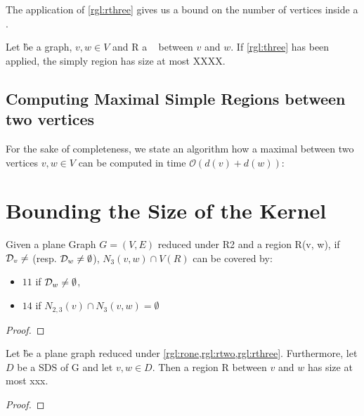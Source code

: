 The application of \cref{rgl:rthree} gives us a bound on the number of vertices inside a \sr. 
\begin{corollary}
    Let \G be a graph, $v, w\in V$ and R a \sr~ between $v$ and $w$. If \cref{rgl:three} has been applied, the simply region has size at most XXXX.
\end{corollary}

\subsection{Computing Maximal Simple Regions between two vertices}

For the sake of completeness, we state an algorithm how a maximal \sr between two vertices $v,w \in V$ can be computed in time $\mathcal{O}(d(v) + d(w))$:

%    


%    

\section{Bounding the Size of the Kernel}


\begin{lemma}
   Given a plane Graph $G = (V,E)$ reduced under R2 and a region R(v, w), if $\mathcal{D}_{v} \neq $ (resp. $\mathcal{D}_{w} \neq \emptyset$), $N_3(v,w) \cap V(R)$ can be covered by: 
   \begin{itemize}
    \item $11$ \sr if $\mathcal{D}_{w} \neq \emptyset$, 
    \item $14$ \sr if $N_{2,3}(v) \cap N_3(v,w) = \emptyset$
   \end{itemize}
\end{lemma}

\begin{proof} 
\end{proof}

\begin{lemma}
    Let \G be a plane graph reduced under \cref{rgl:rone,rgl:rtwo,rgl:rthree}. Furthermore, let $D$ be a SDS of G and let $v,w \in D$. Then a region R between $v$ and $w$ has size at most xxx.
\end{lemma}
\begin{proof} 
\end{proof}

